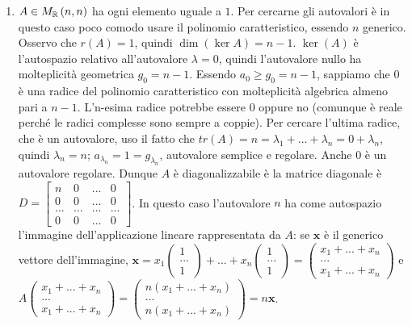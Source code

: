 \documentclass{article}
\begin{document}
\begin{enumerate}
\item $A\in M_{%
\mathbb{R}
}\left( n,n\right) $ ha ogni elemento uguale a $1$. Per cercarne gli
autovalori \`{e} in questo caso poco comodo usare il polinomio
caratteristico, essendo $n$ generico. Osservo che $r\left( A\right) =1$,
quindi $\dim \left( \ker A\right) =n-1$. $\ker \left( A\right) $ \`{e}
l'autospazio relativo all'autovalore $\lambda =0$, quindi l'autovalore nullo
ha molteplicit\`{a} geometrica $g_{0}=n-1$. Essendo $a_{0}\geq g_{0}=n-1$,
sappiamo che $0$ \`{e} una radice del polinomio caratteristico con
molteplicit\`{a} algebrica almeno pari a $n-1$. L'n-esima radice potrebbe
essere $0$ oppure no (comunque \`{e} reale perch\'{e} le radici complesse
sono sempre a coppie). Per cercare l'ultima radice, che \`{e} un autovalore,
uso il fatto che $tr\left( A\right) =n=\lambda _{1}+...+\lambda
_{n}=0+\lambda _{n}$, quindi $\lambda _{n}=n$; $a_{\lambda
_{n}}=1=g_{\lambda _{n}}$, autovalore semplice e regolare. Anche $0$ \`{e}
un autovalore regolare. Dunque $A$ \`{e} diagonalizzabile \`{e} la matrice
diagonale \`{e} $D=\left[ 
\begin{array}{cccc}
n & 0 & ... & 0 \\ 
0 & 0 & ... & 0 \\ 
... & ... & ... & ... \\ 
0 & 0 & ... & 0%
\end{array}%
\right] $. In questo caso l'autovalore $n$ ha come autospazio l'immagine
dell'applicazione lineare rappresentata da $A$: se $\mathbf{x}$ \`{e} il
generico vettore dell'immagine, $\mathbf{x}=x_{1}\left( 
\begin{array}{c}
1 \\ 
... \\ 
1%
\end{array}%
\right) +...+x_{n}\left( 
\begin{array}{c}
1 \\ 
... \\ 
1%
\end{array}%
\right) =\left( 
\begin{array}{c}
x_{1}+...+x_{n} \\ 
... \\ 
x_{1}+...+x_{n}%
\end{array}%
\right) $ e $A\left( 
\begin{array}{c}
x_{1}+...+x_{n} \\ 
... \\ 
x_{1}+...+x_{n}%
\end{array}%
\right) =\left( 
\begin{array}{c}
n\left( x_{1}+...+x_{n}\right) \\ 
... \\ 
n\left( x_{1}+...+x_{n}\right)%
\end{array}%
\right) =n\mathbf{x}$.
\end{enumerate}
\end{document}
